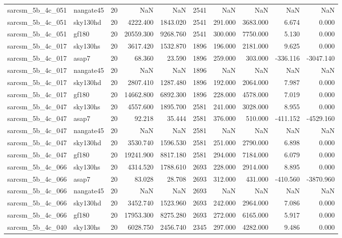 \documentclass{article}
\begin{document}
\begin{longtable}{llrrrrrrrr}
sarcsm\_5b\_4c\_051 & nangate45 & 20 & NaN & NaN & 2541 & NaN & NaN & NaN & NaN \\
sarcsm\_5b\_4c\_051 & sky130hd & 20 & 4222.400 & 1843.020 & 2541 & 291.000 & 3683.000 & 6.674 & 0.000 \\
sarcsm\_5b\_4c\_051 & gf180 & 20 & 20559.300 & 9268.760 & 2541 & 300.000 & 7750.000 & 5.130 & 0.000 \\
sarcsm\_5b\_4c\_017 & sky130hs & 20 & 3617.420 & 1532.870 & 1896 & 196.000 & 2181.000 & 9.625 & 0.000 \\
sarcsm\_5b\_4c\_017 & asap7 & 20 & 68.360 & 23.590 & 1896 & 259.000 & 303.000 & -336.116 & -3047.140 \\
sarcsm\_5b\_4c\_017 & nangate45 & 20 & NaN & NaN & 1896 & NaN & NaN & NaN & NaN \\
sarcsm\_5b\_4c\_017 & sky130hd & 20 & 2807.410 & 1287.480 & 1896 & 192.000 & 2064.000 & 7.987 & 0.000 \\
sarcsm\_5b\_4c\_017 & gf180 & 20 & 14662.800 & 6892.300 & 1896 & 228.000 & 4578.000 & 7.019 & 0.000 \\
sarcsm\_5b\_4c\_047 & sky130hs & 20 & 4557.600 & 1895.700 & 2581 & 241.000 & 3028.000 & 8.955 & 0.000 \\
sarcsm\_5b\_4c\_047 & asap7 & 20 & 92.218 & 35.444 & 2581 & 376.000 & 510.000 & -411.152 & -4529.160 \\
sarcsm\_5b\_4c\_047 & nangate45 & 20 & NaN & NaN & 2581 & NaN & NaN & NaN & NaN \\
sarcsm\_5b\_4c\_047 & sky130hd & 20 & 3530.740 & 1596.530 & 2581 & 251.000 & 2790.000 & 6.898 & 0.000 \\
sarcsm\_5b\_4c\_047 & gf180 & 20 & 19241.900 & 8817.180 & 2581 & 294.000 & 7184.000 & 6.079 & 0.000 \\
sarcsm\_5b\_4c\_066 & sky130hs & 20 & 4314.520 & 1788.610 & 2693 & 228.000 & 2914.000 & 8.895 & 0.000 \\
sarcsm\_5b\_4c\_066 & asap7 & 20 & 83.028 & 28.708 & 2693 & 312.000 & 431.000 & -410.560 & -3870.960 \\
sarcsm\_5b\_4c\_066 & nangate45 & 20 & NaN & NaN & 2693 & NaN & NaN & NaN & NaN \\
sarcsm\_5b\_4c\_066 & sky130hd & 20 & 3452.740 & 1523.960 & 2693 & 242.000 & 2964.000 & 7.086 & 0.000 \\
sarcsm\_5b\_4c\_066 & gf180 & 20 & 17953.300 & 8275.280 & 2693 & 272.000 & 6165.000 & 5.917 & 0.000 \\
sarcsm\_5b\_4c\_040 & sky130hs & 20 & 6028.750 & 2456.740 & 2345 & 297.000 & 4282.000 & 9.486 & 0.000 \\

\end{longtable}
\end{document}
